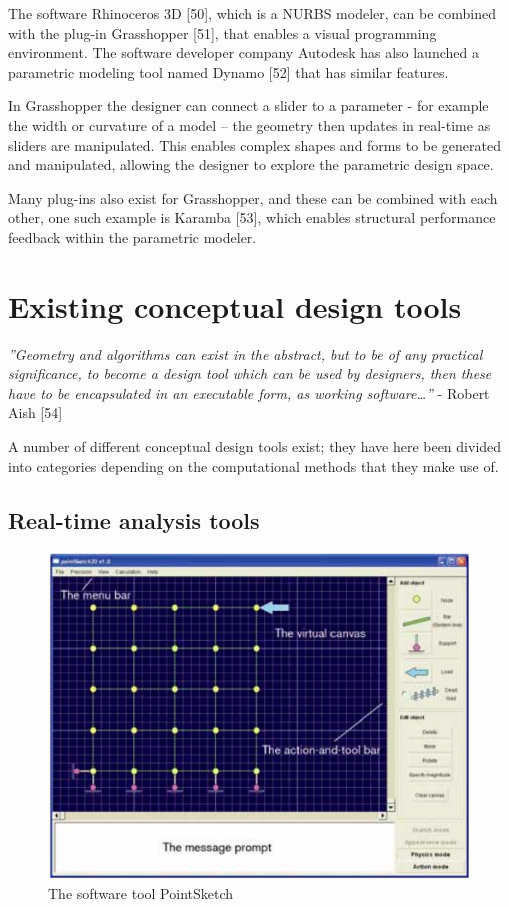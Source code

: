 The software Rhinoceros 3D [50], which is a NURBS modeler, can be combined with the plug-in Grasshopper [51], that enables a visual programming environment. The software developer company Autodesk has also launched a parametric modeling tool named Dynamo [52] that has similar features.


In Grasshopper the designer can connect a slider to a parameter - for example the width or curvature of a model – the geometry then updates in real-time as sliders are manipulated. This enables complex shapes and forms to be generated and manipulated, allowing the designer to explore the parametric design space. 

Many plug-ins also exist for Grasshopper, and these can be combined with each other, one such example is Karamba [53], which enables structural performance feedback within the parametric modeler. 

\section{Existing conceptual design tools}

\textit{''Geometry and algorithms can exist in the abstract, but to be of any practical significance, to become a design tool which can be used by designers, then these have to be encapsulated in an executable form, as working software…''} - Robert Aish [54]

A number of different conceptual design tools exist; they have here been divided into categories depending on the computational methods that they make use of.

\subsection{Real-time analysis tools}

\begin{figure}
  \includegraphics[width=350pt]{graphics/pointsketch.png}
  \caption{The software tool PointSketch}
  \label{fig:pointsketch}
\end{figure}


